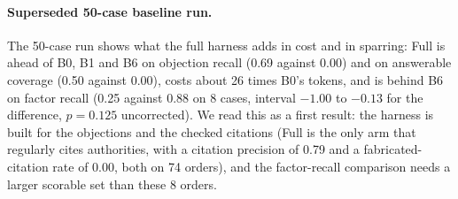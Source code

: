\paragraph{Superseded 50-case baseline run.}   The 50-case run shows what the full harness adds in cost and in sparring: Full is ahead of B0, B1 and B6 on objection recall (0.69 against 0.00) and on answerable coverage (0.50 against 0.00), costs about 26 times B0's tokens, and is behind B6 on factor recall (0.25 against 0.88 on 8 cases, interval $-1.00$ to $-0.13$ for the difference, $p=0.125$ uncorrected). We read this as a first result: the harness is built for the objections and the checked citations (Full is the only arm that regularly cites authorities, with a citation precision of 0.79 and a fabricated-citation rate of 0.00, both on 74 orders), and the factor-recall comparison needs a larger scorable set than these 8 orders.

